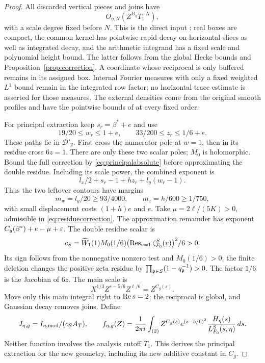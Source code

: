 \begin{proof}
All discarded vertical pieces and joins have
\begin{equation}\label{eq:externaltail}
 O_{\eta,N}(Z^{B_\eta}T_1^{-N}),
\end{equation}
with a scale degree fixed before $N$. This is the direct input : real boxes are compact, the common kernel has pointwise rapid decay on horizontal slices as well as integrated decay, and the arithmetic integrand has a fixed scale and polynomial height bound. The latter follows from the global Hecke bounds  and Proposition~\ref{prop:correction}. A coordinate whose reciprocal is only buffered remains in its assigned box. Internal Fourier measures with only a fixed weighted $L^1$ bound remain in the integrated row factor; no horizontal trace estimate is asserted for those measures. The external densities come from the original smooth profiles and have the pointwise bounds of  at every fixed order.

For principal extraction keep $s_r=\beta^*+e$ and use
\[
 19/20\le w_r\le1+e,\qquad33/200\le z_r\le1/6+e.
\]
These paths lie in $\mathcal D'_2$. First cross the numerator pole at $w=1$, then in its residue cross $6z=1$. There are only these two scalar poles; $M_0$ is holomorphic. Bound the full correction by \eqref{eq:principalabsolute} before approximating the double residue. Including its scale power, the combined exponent is
\begin{equation}\label{eq:principalpower}
 l_x/2+s_r-1+hz_r+l_y(w_r-1).
\end{equation}
Thus the two leftover contours have margins
\begin{equation}\label{eq:principalmargins}
 m_w=l_y/20\ge93/4000,\qquad m_z=h/600\ge1/750,
\end{equation}
with small displacement costs $(1+h)e$ and $e$. Take $\mu=2\ell/(5K)>0$, admissible in \eqref{eq:residuecorrection}. The approximation remainder has exponent $C_g(\beta^*)+e-\mu+\varepsilon$. The double residue scalar is
\begin{equation}\label{eq:scalar}
 c_S=\widehat W_1(1)M_0(1/6)
       \bigl(\operatorname{Res}_{v=1}\zeta_{F_0}^S(v)\bigr)^2/6>0.
\end{equation}
Its sign follows from the nonnegative nonzero test and $M_0(1/6)>0$; the finite deletion changes the positive zeta residue by $\prod_{\mathfrak p\in S}(1-q_\mathfrak p^{-1})>0$. The factor $1/6$ is the Jacobian of $6z$. The main scale is
\[
 X^{1/3}Z^{s-5/6}Z^{\ell/6}=Z^{C_g(s)}.
\]
Move only this main integral right to $\operatorname{Re} s=2$; the reciprocal is global, and Gaussian decay removes joins. Define
\begin{equation}\label{eq:Jf}
 J_{\eta,g}=I_{\eta,{\rm mod}}/(c_SA_T),\qquad
 f_{\eta,g}(Z)=\frac1{2\pi i}\int_{(2)}Z^{C_g(s)}e^{(s-5/6)^2}
                    \frac{H_\eta(s)}{L_{F_0}^S(s,\eta)}\,ds.
\end{equation}
Neither function involves the analysis cutoff $T_1$. This derives the principal extraction for the new geometry, including its new additive constant in $C_g$.


\end{proof}
